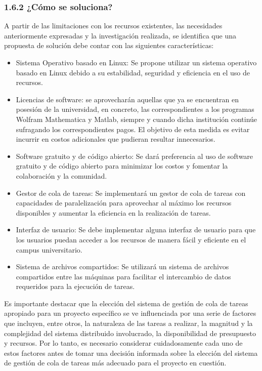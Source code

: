 \begin{doublespace}
\begin{multicols}{2}
  \subsubsection{1.6.2 ¿Cómo se soluciona?}
  A partir de las limitaciones con los recursos existentes, las necesidades anteriormente expresadas y la investigación realizada, se identifica que una propuesta de solución debe contar con las siguientes características:
  \begin{itemize}
    \item Sistema Operativo basado en Linux: Se propone utilizar un sistema operativo basado en Linux debido a su estabilidad, seguridad y eficiencia en el uso de recursos.
    \item Licencias de software: se aprovecharán aquellas que ya se encuentran en posesión de la universidad, en concreto, las correspondientes a los programas Wolfram Mathematica y Matlab, siempre y cuando dicha institución continúe sufragando los correspondientes pagos. El objetivo de esta medida es evitar incurrir en costos adicionales que pudieran resultar innecesarios.
    \item Software gratuito y de código abierto: Se dará preferencia al uso de software gratuito y de código abierto para minimizar los costos y fomentar la colaboración y la comunidad.
    \item Gestor de cola de tareas: Se implementará un gestor de cola de tareas con capacidades de paralelización para aprovechar al máximo los recursos disponibles y aumentar la eficiencia en la realización de tareas.
    \item Interfaz de usuario: Se debe implementar alguna interfaz de usuario para que los usuarios puedan acceder a los recursos de manera fácil y eficiente en el campus universitario.
    \item Sistema de archivos compartidos: Se utilizará un sistema de archivos compartidos entre las máquinas para facilitar el intercambio de datos requeridos para la ejecución de tareas.
    \end{itemize} 
    Es importante destacar que la elección del sistema de gestión de cola de tareas apropiado para un proyecto específico se ve influenciada por una serie de factores que incluyen, entre otros, la naturaleza de las tareas a realizar, la magnitud y la complejidad del sistema distribuido involucrado, la disponibilidad de presupuesto y recursos. Por lo tanto, es necesario considerar cuidadosamente cada uno de estos factores antes de tomar una decisión informada sobre la elección del sistema de gestión de cola de tareas más adecuado para el proyecto en cuestión.


\end{multicols}
\end{doublespace}
